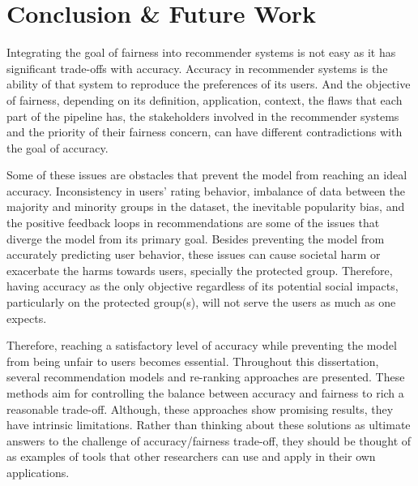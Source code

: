 \chapter{Conclusion \& Future Work}
\label{conclude}


Integrating the goal of fairness into recommender systems is not easy as it has significant trade-offs with accuracy. Accuracy in recommender systems is the ability of that system to reproduce the preferences of its users. And the objective of fairness, depending on its definition, application, context, the flaws that each part of the pipeline has, the stakeholders involved in the recommender systems and the priority of their fairness concern, can have different contradictions with the goal of accuracy. 

Some of these issues are obstacles that prevent the model from reaching an ideal accuracy. Inconsistency in users' rating behavior, imbalance of data between the majority and minority groups in the dataset, the inevitable popularity bias, and the positive feedback loops in recommendations are some of the issues that diverge the model from its primary goal. Besides preventing the model from accurately predicting user behavior, these issues can cause societal harm or exacerbate the harms towards users, specially the protected group. Therefore, having accuracy as the only objective regardless of its potential social impacts, particularly on the protected group(s), will not serve the users as much as one expects. 

Therefore, reaching a satisfactory level of accuracy while preventing the model from being unfair to users becomes essential. Throughout this dissertation, several recommendation models and re-ranking approaches are presented. These methods aim for controlling the balance between accuracy and fairness to rich a reasonable trade-off. Although, these approaches show promising results, they have intrinsic limitations. Rather than thinking about these solutions as ultimate answers to the challenge of accuracy/fairness trade-off, they should be thought of as examples of tools that other researchers can use and apply in their own applications. 


